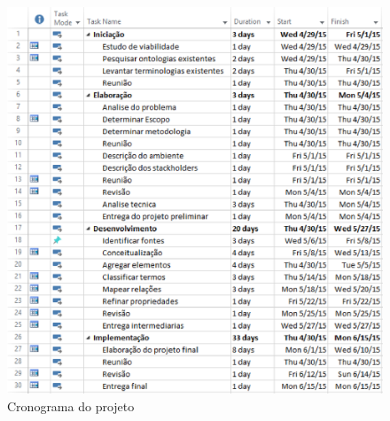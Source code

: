  \begin{figure}[ht]
  \centering
    \includegraphics[keepaspectratio=true,scale=0.5]{figuras/cronograma.eps}
  \caption{Cronograma do projeto}
\end{figure}